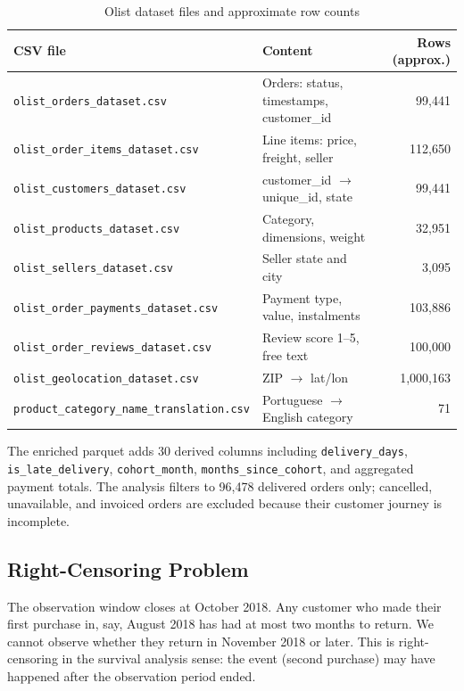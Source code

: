 \begin{table}[h]
\centering
\caption{Olist dataset files and approximate row counts}
\label{tab:olist-files}
\begin{tabular}{llr}
\toprule
\textbf{CSV file} & \textbf{Content} & \textbf{Rows (approx.)} \\
\midrule
\texttt{olist\_orders\_dataset.csv}         & Orders: status, timestamps, customer\_id & 99,441 \\
\texttt{olist\_order\_items\_dataset.csv}   & Line items: price, freight, seller       & 112,650 \\
\texttt{olist\_customers\_dataset.csv}      & customer\_id $\to$ unique\_id, state     & 99,441 \\
\texttt{olist\_products\_dataset.csv}       & Category, dimensions, weight             & 32,951 \\
\texttt{olist\_sellers\_dataset.csv}        & Seller state and city                    & 3,095 \\
\texttt{olist\_order\_payments\_dataset.csv}& Payment type, value, instalments         & 103,886 \\
\texttt{olist\_order\_reviews\_dataset.csv} & Review score 1--5, free text             & 100,000 \\
\texttt{olist\_geolocation\_dataset.csv}    & ZIP $\to$ lat/lon                        & 1,000,163 \\
\texttt{product\_category\_name\_translation.csv} & Portuguese $\to$ English category  & 71 \\
\bottomrule
\end{tabular}
\end{table}

The enriched parquet adds 30 derived columns including \texttt{delivery\_days},
\texttt{is\_late\_delivery}, \texttt{cohort\_month}, \texttt{months\_since\_cohort},
and aggregated payment totals. The analysis filters to 96,478 delivered orders
only; cancelled, unavailable, and invoiced orders are excluded because their
customer journey is incomplete.

\subsection{Right-Censoring Problem}

The observation window closes at October 2018. Any customer who made their first
purchase in, say, August 2018 has had at most two months to return. We cannot
observe whether they return in November 2018 or later. This is right-censoring
in the survival analysis sense: the event (second purchase) may have happened
after the observation period ended.

